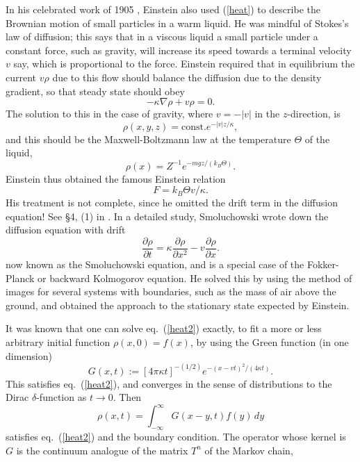 In his celebrated work of 1905 \cite{Einstein1}, Einstein also used
(\ref{heat}) to describe the Brownian motion of small particles in a warm
liquid. He was mindful of Stokes's law of diffusion; this says that in a
viscous liquid a small particle under a constant force, such as gravity,
will increase its speed towards a terminal velocity $v$ say, which is
proportional to the force. Einstein required that in equilibrium
the current $v\rho$ due to this flow should balance the diffusion due to the
density gradient, so that steady state should obey
\begin{equation}
-\kappa\nabla \rho+v\rho=0.
\end{equation}
The solution to this in the case of gravity, where $v=-|v|$ in the
$z$-direction, is
\begin{equation}
\rho(x,y,z)=\mbox{const.}e^{-|v|z/\kappa},
\end{equation}
and this should be the 
Maxwell-Boltzmann law at the temperature $\Theta$ of the liquid,
\begin{equation}
\rho(x)=Z^{-1}e^{-mgz/(k_B\Theta)}.
\end{equation}
Einstein thus obtained the famous Einstein relation
\begin{equation}
F=k_B\Theta v/\kappa.
\end{equation}
His treatment is not
complete, since he omitted
the drift term in the diffusion equation! See \S 4, (1) in \cite{Einstein1}.
In a detailed
study, Smoluchowski \cite{Smol} wrote down the diffusion equation with drift
\begin{equation}
\frac{\partial \rho}{\partial t}=\kappa\frac{\partial \rho}{\partial x^2}-
v\frac{\partial \rho}{\partial x}.
\label{heat2}
\end{equation}
now known as the Smoluchowski equation, and is a special case of the
Fokker-Planck or backward Kolmogorov equation. He solved this by
using the method of images for several systems with
boundaries, such as the mass of air above the ground, and obtained
the approach to the stationary state expected by Einstein. 

It was known that one can solve eq.~(\ref{heat2}) exactly,
to fit a more or less arbitrary initial function $\rho(x,0)=f(x)$, by using
the Green function (in one dimension)
\begin{equation}
G(x,t):=[4\pi\kappa t]^{-(1/2)}e^{-(x-vt)^2/(4\kappa t)}.
\end{equation}
This satisfies eq.~(\ref{heat2}), and converges in the sense of
distributions to the Dirac $\delta$-function as $t\rightarrow0$. Then
\begin{equation}
\rho(x,t)=\int_{-\infty}^\infty G(x-y,t)f(y)\,dy
\label{solution}
\end{equation}
satisfies eq.~(\ref{heat2}) and the boundary condition.
The operator whose kernel is $G$ is the continuum analogue of the matrix
$T^n$ of the Markov chain, 

